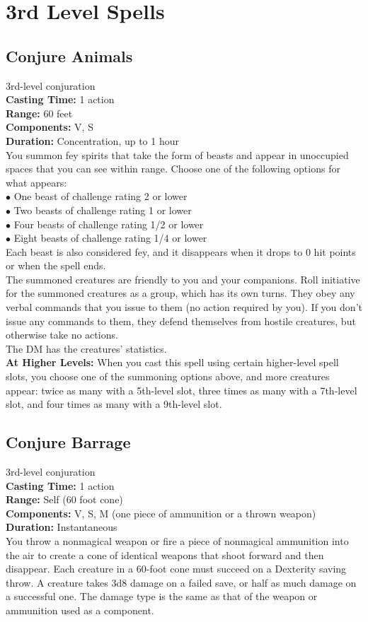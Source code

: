 \documentclass[11pt, A4paper, english]{article}
\begin{document}
	\section{3rd Level Spells}
		\subsection{Conjure Animals}
3rd-level conjuration \\
\textbf{Casting Time:} 1 action \\
\textbf{Range:} 60 feet \\
\textbf{Components:} V, S \\
\textbf{Duration:} Concentration, up to 1 hour \\
You summon fey spirits that take the form of beasts and appear in unoccupied spaces that you can see within range. Choose one of the following options for what appears: \\
\indent $\bullet$ One beast of challenge rating 2 or lower \\
\indent $\bullet$ Two beasts of challenge rating 1 or lower \\
\indent $\bullet$ Four beasts of challenge rating 1/2 or lower \\
\indent $\bullet$ Eight beasts of challenge rating 1/4 or lower \\
Each beast is also considered fey, and it disappears when it drops to 0 hit points or when the spell ends. \\
The summoned creatures are friendly to you and your companions. Roll initiative for the summoned creatures as a group, which has its own turns. They obey any verbal commands that you issue to them (no action required by you). If you don’t issue any commands to them, they defend themselves from hostile creatures, but otherwise take no actions. \\
The DM has the creatures’ statistics. \\
\textbf{At Higher Levels:} When you cast this spell using certain higher-level spell slots, you choose one of the summoning options above, and more creatures appear: twice as many with a 5th-level slot, three times as many with a 7th-level slot, and four times as many with a 9th-level slot.

		\subsection{Conjure Barrage}
3rd-level conjuration \\
\textbf{Casting Time:} 1 action \\
\textbf{Range:} Self (60 foot cone) \\
\textbf{Components:} V, S, M (one piece of ammunition or a thrown weapon) \\
\textbf{Duration:} Instantaneous \\
You throw a nonmagical weapon or fire a piece of nonmagical ammunition into the air to create a cone of identical weapons that shoot forward and then disappear. Each creature in a 60-foot cone must succeed on a Dexterity saving throw. A creature takes 3d8 damage on a failed save, or half as much damage on a successful one. The damage type is the same as that of the weapon or ammunition used as a component.
\end{document}
